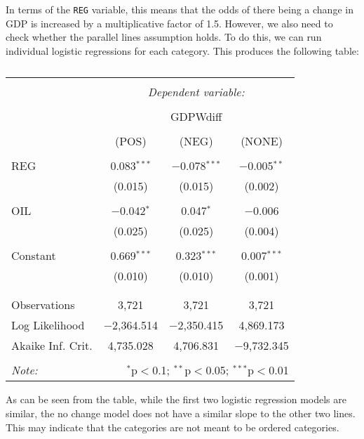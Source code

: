 \documentclass[12pt,letterpaper]{article}
\begin{document}
\begin{enumerate}
	\noindent In terms of the \texttt{REG} variable, this means that the odds of there being a change in GDP is increased by a multiplicative factor of 1.5. 
	\noindent However, we also need to check whether the parallel lines assumption holds. To do this, we can run individual logistic regressions for each category. This produces the following table:
	
	\begin{table}[!htbp] \centering 
		\caption{} 
		\label{} 
		\begin{tabular}{@{\extracolsep{5pt}}lccc} 
			\\[-1.8ex]\hline 
			\hline \\[-1.8ex] 
			& \multicolumn{3}{c}{\textit{Dependent variable:}} \\ 
			\cline{2-4} 
			\\[-1.8ex] & \multicolumn{3}{c}{GDPWdiff} \\ 
			\\[-1.8ex] & (POS) & (NEG) & (NONE)\\ 
			\hline \\[-1.8ex] 
			REG & 0.083$^{***}$ & $-$0.078$^{***}$ & $-$0.005$^{**}$ \\ 
			& (0.015) & (0.015) & (0.002) \\ 
			& & & \\ 
			OIL & $-$0.042$^{*}$ & 0.047$^{*}$ & $-$0.006 \\ 
			& (0.025) & (0.025) & (0.004) \\ 
			& & & \\ 
			Constant & 0.669$^{***}$ & 0.323$^{***}$ & 0.007$^{***}$ \\ 
			& (0.010) & (0.010) & (0.001) \\ 
			& & & \\ 
			\hline \\[-1.8ex] 
			Observations & 3,721 & 3,721 & 3,721 \\ 
			Log Likelihood & $-$2,364.514 & $-$2,350.415 & 4,869.173 \\ 
			Akaike Inf. Crit. & 4,735.028 & 4,706.831 & $-$9,732.345 \\ 
			\hline 
			\hline \\[-1.8ex] 
			\textit{Note:}  & \multicolumn{3}{r}{$^{*}$p$<$0.1; $^{**}$p$<$0.05; $^{***}$p$<$0.01} \\ 
		\end{tabular} 
	\end{table} 

	\noindent As can be seen from the table, while the first two logistic regression models are similar, the no change model does not have a similar slope to the other two lines. This may indicate that the categories are not meant to be ordered categories. \\
	

\end{enumerate}
\end{document}
